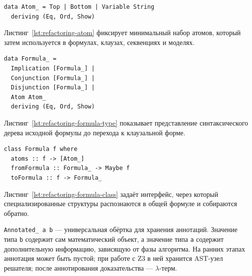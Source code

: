 \documentclass[14pt, russian]{scrartcl}
\begin{document}
\begin{listing}[!htb]
\caption{Тип атомарных формул \texttt{Atom\_}}
\label{lst:refactoring-atom}
\begin{verbatim}
data Atom_ = Top | Bottom | Variable String
  deriving (Eq, Ord, Show)
\end{verbatim}
\end{listing}

Листинг~\ref{lst:refactoring-atom} фиксирует минимальный набор атомов,
который затем используется в формулах, клауза\-х, секвенциях и моделях.

\begin{listing}[!htb]
\caption{Тип формул \texttt{Formula\_}}
\label{lst:refactoring-formula-type}
\begin{verbatim}
data Formula_ =
  Implication [Formula_] |
  Conjunction [Formula_] |
  Disjunction [Formula_] |
  Atom Atom_
  deriving (Eq, Ord, Show)
\end{verbatim}
\end{listing}

Листинг~\ref{lst:refactoring-formula-type} показывает представление
синтаксического дерева исходной формулы до перехода к клаузальной форме.

\begin{listing}[!htb]
\caption{Класс преобразования в формулу \texttt{Formula}}
\label{lst:refactoring-formula-class}
\begin{verbatim}
class Formula f where
  atoms :: f -> [Atom_]
  fromFormula :: Formula_ -> Maybe f
  toFormula :: f -> Formula_
\end{verbatim}
\end{listing}

Листинг~\ref{lst:refactoring-formula-class} задаёт интерфейс, через который
специализированные структуры распознаются в общей формуле и собираются обратно.

\texttt{Annotated\_ a b} --- универсальная обёртка для хранения аннотаций.
Значение типа \texttt{b} содержит сам математический объект, а значение типа
\texttt{a} содержит дополнительную информацию, зависящую от фазы алгоритма. На
ранних этапах аннотация может быть пустой; при работе с Z3 в ней хранится
AST-узел решателя; после аннотирования доказательства --- $\lambda$-терм.
\end{document}
